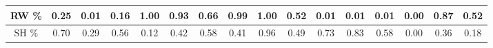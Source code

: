 \begin{table}[H]
\begin{tabular}{|c|c|c|c|c|c|c|c|c|c|c|c|c|c|c|c|}
		RW \% & \cellcolor[HTML]{ECF4FF}0.25                                             & \cellcolor[HTML]{ECF4FF}0.01                                             & \cellcolor[HTML]{ECF4FF}0.16                                             & \cellcolor[HTML]{ECF4FF}1.00                                            & \cellcolor[HTML]{ECF4FF}0.93                                           & \cellcolor[HTML]{ECF4FF}0.66                                           & \cellcolor[HTML]{ECF4FF}0.99                                           & \cellcolor[HTML]{ECF4FF}1.00                                             & \cellcolor[HTML]{ECF4FF}0.52                                             & \cellcolor[HTML]{ECF4FF}0.01                                             & \cellcolor[HTML]{ECF4FF}0.01                                             & \cellcolor[HTML]{ECF4FF}0.01                                             & \cellcolor[HTML]{ECF4FF}0.00                                             & \cellcolor[HTML]{ECF4FF}0.87                                             & \cellcolor[HTML]{ECF4FF}0.52                                             \\ \hline
		SH \% & \cellcolor[HTML]{CBCEFB}0.70                                             & \cellcolor[HTML]{CBCEFB}0.29                                             & \cellcolor[HTML]{CBCEFB}0.56                                             & \cellcolor[HTML]{CBCEFB}0.12                                            & \cellcolor[HTML]{CBCEFB}0.42                                           & \cellcolor[HTML]{CBCEFB}0.58                                           & \cellcolor[HTML]{CBCEFB}0.41                                           & \cellcolor[HTML]{CBCEFB}0.96                                             & \cellcolor[HTML]{CBCEFB}0.49                                             & \cellcolor[HTML]{CBCEFB}0.73                                             & \cellcolor[HTML]{CBCEFB}0.83                                             & \cellcolor[HTML]{CBCEFB}0.58                                             & \cellcolor[HTML]{CBCEFB}0.00                                             & \cellcolor[HTML]{CBCEFB}0.36                                             & \cellcolor[HTML]{CBCEFB}0.18                                             \\ \hline\hline

\end{tabular}
\end{table}
